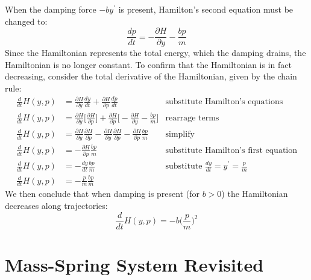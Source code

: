 \documentclass[12pt]{article}
\begin{document}
	\indent \indent When the damping force $-by^\prime$ is present, Hamilton's second equation must be changed to:
	\begin{equation*}
	\frac{dp}{dt}=-\frac{\partial H}{\partial y}-\frac{bp}{m}
	\end{equation*}
	\indent Since the Hamiltonian represents the total energy, which the damping drains, the Hamiltonian is no longer constant. To confirm that the Hamiltonian is in fact decreasing, consider the total derivative of the Hamiltonian, given by the chain rule:
	\begin{align*}
	\frac{d}{dt}H(y,p)&=\frac{\partial H}{\partial y}\frac{dy}{dt}+\frac{\partial H}{\partial p}\frac{dp}{dt} &\text{substitute Hamilton's equations}
	\\
	\frac{d}{dt}H(y,p)&=\frac{\partial H}{\partial y}\bigg[\frac{\partial H}{\partial p}\bigg]+\frac{\partial H}{\partial p}\bigg[-\frac{\partial H}{\partial y}-\frac{bp}{m}\bigg] &\text{rearrage terms}
	\\
	\frac{d}{dt}H(y,p)&=\frac{\partial H}{\partial y}\frac{\partial H}{\partial p} - \frac{\partial H}{\partial y}\frac{\partial H}{\partial p} - \frac{\partial H}{\partial p}\frac{bp}{m} &\text{simplify}
	\\
	\frac{d}{dt}H(y,p)&= - \frac{\partial H}{\partial p}\frac{bp}{m} &\text{substitute Hamilton's first equation}
	\\
	\frac{d}{dt}H(y,p)&= - \frac{dy}{dt}\frac{bp}{m} &\text{substitute $\frac{dy}{dt}=y^\prime=\frac{p}{m}$}
	\\
	\frac{d}{dt}H(y,p)&= - \frac{p}{m}\frac{bp}{m}
	\end{align*}
	\indent We then conclude that when damping is present (for $b>0$) the Hamiltonian decreases along trajectories:
	\begin{equation*}
	\frac{d}{dt}H(y,p)= - b\bigg(\frac{p}{m}\bigg)^2
	\end{equation*}
	
	\clearpage
	
	\section{Mass-Spring System Revisited}
	
\end{document}
